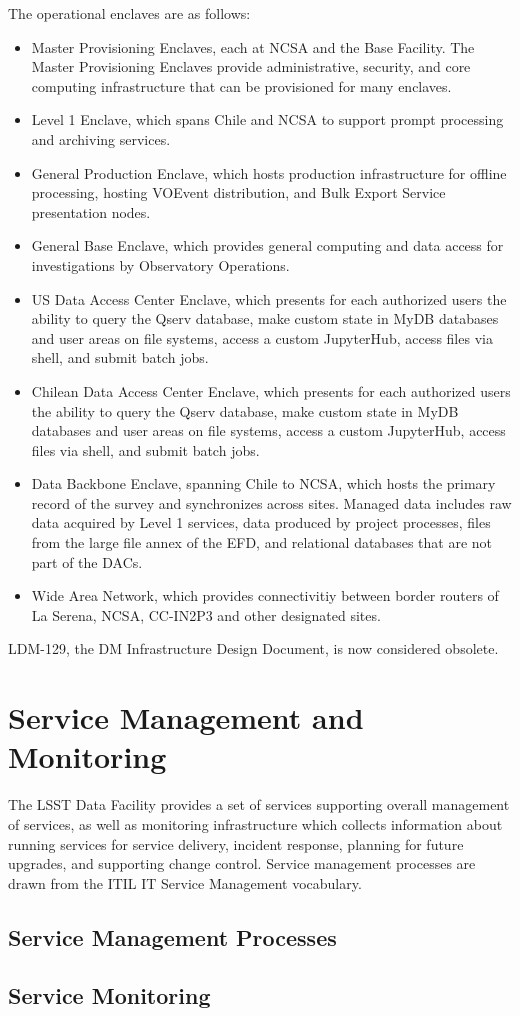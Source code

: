 The operational enclaves are as follows:

\begin{itemize}
\item  Master Provisioning Enclaves, each at NCSA and the Base Facility. The 
Master Provisioning Enclaves provide administrative, security, and core computing 
infrastructure that can be provisioned for many enclaves.
\item  Level 1 Enclave, which spans Chile and NCSA to support prompt processing 
and archiving services.
\item  General Production Enclave, which hosts production infrastructure for 
offline processing, hosting VOEvent distribution, and Bulk Export Service 
presentation nodes.
\item  General Base Enclave, which provides general computing and data access for 
investigations by Observatory Operations.
\item  US Data Access Center Enclave, which presents for each authorized users 
the ability to query the Qserv database, make custom state in MyDB databases and 
user areas on file systems, access a custom JupyterHub, access files via shell, 
and submit batch jobs. 
\item  Chilean Data Access Center Enclave, which presents for each authorized 
users the ability to query the Qserv database, make custom state in MyDB 
databases and user areas on file systems, access a custom JupyterHub, access 
files via shell, and submit batch jobs.
\item  Data Backbone Enclave, spanning Chile to NCSA, which hosts the primary 
record of the survey and synchronizes across sites. Managed data includes raw 
data acquired by Level 1 services, data produced by project processes, files from 
the large file annex of the EFD, and relational databases that are not part of the 
DACs.
\item  Wide Area Network, which provides connectivitiy between border routers of 
La Serena, NCSA, CC-IN2P3 and other designated sites.
\end{itemize}

LDM-129, the DM Infrastructure Design Document, is now considered obsolete.

\section{Service Management and Monitoring}

The LSST Data Facility provides a set of services supporting overall management of services, as well as monitoring infrastructure which collects information about running services for service delivery, incident response, planning for future upgrades, and supporting change control. Service management processes are drawn from the ITIL IT Service Management vocabulary.

\subsection{Service Management Processes}


\subsection{Service Monitoring}

